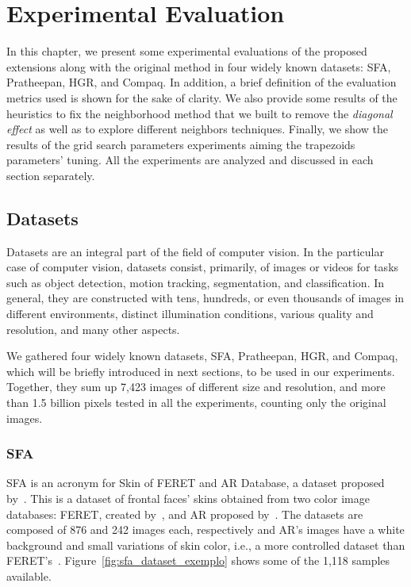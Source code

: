 \chapter{Experimental Evaluation}
\label{cap:experimentos}

In this chapter, we present some experimental evaluations of the proposed extensions along with the original method in four widely known datasets: SFA, Pratheepan, HGR, and Compaq. In addition, a brief definition of the evaluation metrics used is shown for the sake of clarity. We also provide some results of the heuristics to fix the neighborhood method that we built to remove the \emph{diagonal effect} as well as to explore different neighbors techniques. Finally, we show the results of the grid search parameters experiments aiming the trapezoids parameters' tuning. All the experiments are analyzed and discussed in each section separately.


\section{Datasets}
\label{sec:datasets}
Datasets are an integral part of the field of computer vision. In the particular case of computer vision, datasets consist, primarily, of images or videos for tasks such as object detection, motion tracking, segmentation, and classification. In general, they are constructed with tens, hundreds, or even thousands of images in different environments, distinct illumination conditions, various quality and resolution, and many other aspects.

We gathered four widely known datasets, SFA, Pratheepan, HGR, and Compaq, which will be briefly introduced in next sections, to be used in our experiments. Together, they sum up 7,423 images of different size and resolution, and more than 1.5 billion pixels tested in all the experiments, counting only the original images.


\subsection{SFA}
\label{sec:datasets_sfa}
SFA is an acronym for Skin of FERET and AR Database, a dataset proposed by~\citet{sfa-skin-dataset:13}. This is a dataset of frontal faces' skins obtained from two color image databases: FERET, created by~\citet{feret:96}, and AR proposed by~\citet{ar-face-database:98}. The datasets are composed of 876 and 242 images each, respectively and AR's images have a white background and small variations of skin color, i.e., a more controlled dataset than FERET's~\citep{sfa-skin-dataset:13}. Figure~\ref{fig:sfa_dataset_exemplo} shows some of the 1,118 samples available.

